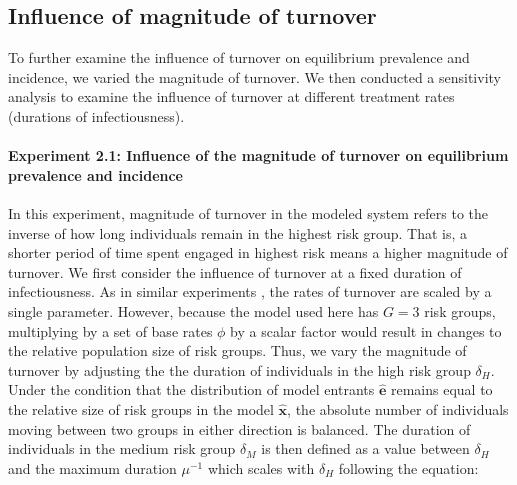 \subsection{Influence of magnitude of turnover}\label{ss:exp-turnover}  %
To further examine the influence of turnover on equilibrium prevalence and incidence, 
we varied the magnitude of turnover. We then conducted a sensitivity analysis   %
to examine the influence of turnover at different treatment rates (durations of infectiousness).
\paragraph{Experiment 2.1: Influence of the magnitude of turnover on equilibrium prevalence and incidence}
In this experiment, magnitude of turnover in the modeled system refers 
to the inverse of how long individuals remain in the highest risk group. %
That is, a shorter period of time spent engaged in highest risk means a higher magnitude of turnover.
We first consider the influence of turnover at a fixed duration of infectiousness.   %
As in similar experiments \citep{Zhang2012,Henry2015},
the rates of turnover are scaled by a single parameter.
However, because the model used here has $G = 3$ risk groups,
multiplying by a set of base rates $\phi$ by a scalar factor would result in changes to the relative population size of risk groups.
Thus, we vary the magnitude of turnover by adjusting the
the duration of individuals in the high risk group $\delta_H$.  %
Under the condition that the distribution of model entrants $\bm{\hat{e}}$ remains equal  %
to the relative size of risk groups in the model $\bm{\hat{x}}$, the absolute number of individuals moving between two groups in either direction
is balanced.
The duration of individuals in the medium risk group $\delta_M$
is then defined as a value between $\delta_H$ and the maximum duration $\mu^{-1}$
which scales with $\delta_H$ following the equation:

